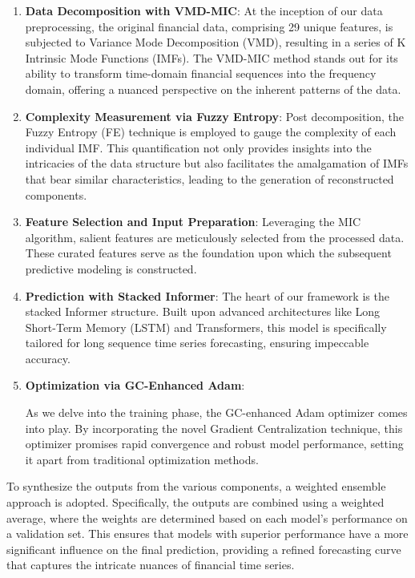 \documentclass[sn-mathphys,Numbered]{sn-jnl}
\theoremstyle{thmstyleone}%
\theoremstyle{thmstyletwo}%
\theoremstyle{thmstylethree}%
\begin{document}
\begin{enumerate}
\item \textbf{Data Decomposition with VMD-MIC}: 
At the inception of our data preprocessing, the original financial data, comprising 29 unique features, is subjected to Variance Mode Decomposition (VMD), resulting in a series of K Intrinsic Mode Functions (IMFs). The VMD-MIC method stands out for its ability to transform time-domain financial sequences into the frequency domain, offering a nuanced perspective on the inherent patterns of the data.
    
\item \textbf{Complexity Measurement via Fuzzy Entropy}:
Post decomposition, the Fuzzy Entropy (FE) technique is employed to gauge the complexity of each individual IMF. This quantification not only provides insights into the intricacies of the data structure but also facilitates the amalgamation of IMFs that bear similar characteristics, leading to the generation of reconstructed components.
    
\item \textbf{Feature Selection and Input Preparation}:
Leveraging the MIC algorithm, salient features are meticulously selected from the processed data. These curated features serve as the foundation upon which the subsequent predictive modeling is constructed.
    
\item \textbf{Prediction with Stacked Informer}:
The heart of our framework is the stacked Informer structure. Built upon advanced architectures like Long Short-Term Memory (LSTM) and Transformers, this model is specifically tailored for long sequence time series forecasting, ensuring impeccable accuracy.
    
\item \textbf{Optimization via GC-Enhanced Adam}:

As we delve into the training phase, the GC-enhanced Adam optimizer comes into play. By incorporating the novel Gradient Centralization technique, this optimizer promises rapid convergence and robust model performance, setting it apart from traditional optimization methods.
\end{enumerate}

To synthesize the outputs from the various components, a weighted ensemble approach is adopted. Specifically, the outputs are combined using a weighted average, where the weights are determined based on each model's performance on a validation set. This ensures that models with superior performance have a more significant influence on the final prediction, providing a refined forecasting curve that captures the intricate nuances of financial time series.
\end{document}
